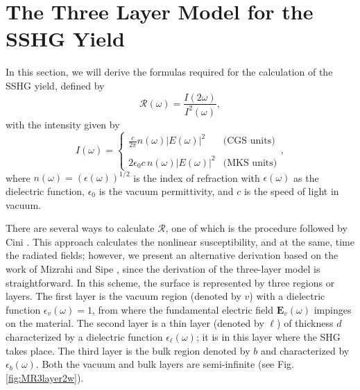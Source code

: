 \documentclass[aps,prb,10pt,showpacs,letterpaper,twocolumn]{revtex4-1}
\begin{document}
\section{The Three Layer Model for the SSHG Yield}\label{sec:threelayer}

In this section, we will derive the formulas required for the calculation of the
SSHG yield, defined by
\begin{equation}\label{eq:rintensities}
\mathcal{R}(\omega)=\frac{I(2\omega)}{I^2(\omega)},
\end{equation}
with the intensity given by \cite{boyd, sutherland}
\begin{equation}\label{eq:intensity}
I(\omega)=
\left\{
\begin{array}{cc}
\frac{c}{2\pi}n(\omega)|E(\omega)|^{2} & \text{(CGS units)} \\\\
2\epsilon_{0}c\, n(\omega)|E(\omega)|^{2} & \text{(MKS units)}
\end{array}
\right.,
\end{equation}
where $n(\omega)=(\epsilon(\omega))^{1/2}$ is the index of refraction with
$\epsilon(\omega)$ as the dielectric function, $\epsilon_{0}$ is the vacuum
permittivity, and $c$ is the speed of light in vacuum.

There are several ways to calculate $\mathcal{R}$, one of which is the procedure
followed by Cini \cite{ciniPRB91}. This approach calculates the nonlinear
susceptibility, and at the same, time the radiated fields; however, we present
an alternative derivation based on the work of Mizrahi and Sipe
\cite{mizrahiJOSA88}, since the derivation of the three-layer model is
straightforward. In this scheme, the surface is represented by three regions or
layers. The first layer is the vacuum region (denoted by $v$) with a dielectric
function $\epsilon_{v}(\omega) = 1$, from where the fundamental electric field
$\mathbf{E}_{v}(\omega)$ impinges on the material. The second layer is a thin
layer (denoted by $\ell$) of thickness $d$ characterized by a dielectric
function $\epsilon_{\ell}(\omega)$; it is in this layer where the SHG takes
place. The third layer is the bulk region denoted by $b$ and characterized by
$\epsilon_{b}(\omega)$. Both the vacuum and bulk layers are semi-infinite (see
Fig. \ref{fig:MR3layer2w}).
 
\end{document}
